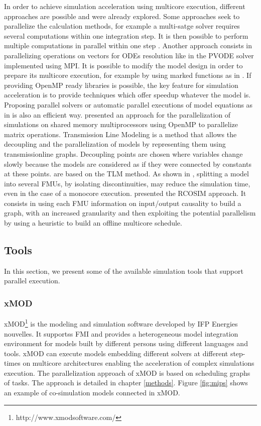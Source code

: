 In order to achieve simulation acceleration using multicore execution, different approaches are possible and were already explored. Some approaches seek to parallelize the calculation methods, for example a multi-satge solver requires several computations within one integration step. It is then possible to perform multiple computations in parallel within one step \cite{iserles:1990}. Another approach consists in parallelizing operations on vectors for ODEs resolution like in the PVODE solver \cite{byrne:1999} implemented using MPI. It is possible to modify the model design in order to prepare its multicore execution, for example by using marked functions as in \cite{Elmqvist2015,Gebremedhin2012}. If providing OpenMP ready libraries is possible, the key feature for simulation acceleration is to provide techniques which offer speedup whatever the model is. Proposing parallel solvers or automatic parallel executions of model equations as in \cite{Elmqvist2014} is also an efficient way. \cite{clauberg:2012} presented an approach for the parallelization of simulations on shared memory multiprocessors using OpenMP to parallelize matrix operations. Transmission Line Modeling \cite{hui:1990} is a method that allows the decoupling and the parallelization of models by representing them using transmissionline graphs. Decoupling points are chosen where variables change slowly because the models are considered as if they were connected by constants at these points. \cite{sjolund:2010,braun:2012} are based on the TLM method. As shown in \cite{Benkhaled_A_2012_ECOSM}, splitting a model into several FMUs, by isolating discontinuities, may reduce the simulation time, even in the case of a monocore execution. \cite{BenKhaled201479} presented the RCOSIM approach. It consists in using each FMU information on input/output causality to build a graph, with an increased granularity and then exploiting the potential parallelism by using a heuristic to build an offline multicore schedule.

\subsection{Tools}

In this section, we present some of the available simulation tools that support parallel execution.

\subsubsection{xMOD}
xMOD\footnote{http://www.xmodsoftware.com/} is the modeling and simulation software developed by IFP Energies nouvelles. It supportss FMI and provides a heterogeneous model integration environment for models built by different persons using different languages and tools. xMOD can execute models embedding different solvers at different step-times on multicore architectures enabling the acceleration of complex simulations execution. The parallelization approach of xMOD is based on scheduling graphs of tasks. The approach is detailed in chapter \ref{methods}. Figure \ref{fig:mips} shows an example of co-simulation models connected in xMOD. 

